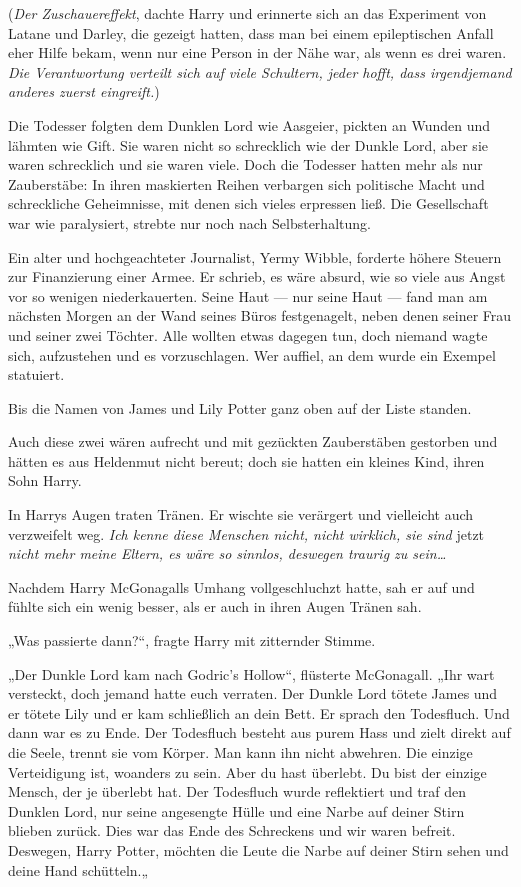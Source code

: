 {(\emph{Der Zuschauereffekt}, dachte Harry und erinnerte sich an das Experiment von Latane und Darley, die gezeigt hatten, dass man bei einem epileptischen Anfall eher Hilfe bekam, wenn nur eine Person in der Nähe war, als wenn es drei waren. \emph{Die Verantwortung verteilt sich auf viele Schultern, jeder hofft, dass irgendjemand anderes zuerst eingreift.})

Die Todesser folgten dem Dunklen Lord wie Aasgeier, pickten an Wunden und lähmten wie Gift. Sie waren nicht so schrecklich wie der Dunkle Lord, aber sie waren schrecklich und sie waren viele. Doch die Todesser hatten mehr als nur Zauberstäbe: In ihren maskierten Reihen verbargen sich politische Macht und schreckliche Geheimnisse, mit denen sich vieles erpressen ließ. Die Gesellschaft war wie paralysiert, strebte nur noch nach Selbsterhaltung.

Ein alter und hochgeachteter Journalist, Yermy Wibble, forderte höhere Steuern zur Finanzierung einer Armee. Er schrieb, es wäre absurd, wie so viele aus Angst vor so wenigen niederkauerten. Seine Haut --- nur seine Haut --- fand man am nächsten Morgen an der Wand seines Büros festgenagelt, neben denen seiner Frau und seiner zwei Töchter. Alle wollten etwas dagegen tun, doch niemand wagte sich, aufzustehen und es vorzuschlagen. Wer auffiel, an dem wurde ein Exempel statuiert.

Bis die Namen von James und Lily Potter ganz oben auf der Liste standen.

Auch diese zwei wären aufrecht und mit gezückten Zauberstäben gestorben und hätten es aus Heldenmut nicht bereut; doch sie hatten ein kleines Kind, ihren Sohn Harry.

In Harrys Augen traten Tränen. Er wischte sie verärgert und vielleicht auch verzweifelt weg. \emph{Ich kenne diese Menschen nicht, nicht wirklich, sie sind} jetzt \emph{nicht mehr meine Eltern, es wäre so sinnlos, deswegen traurig zu sein…}

Nachdem Harry McGonagalls Umhang vollgeschluchzt hatte, sah er auf und fühlte sich ein wenig besser, als er auch in ihren Augen Tränen sah.

„Was passierte dann?“, fragte Harry mit zitternder Stimme.

„Der Dunkle Lord kam nach Godric's Hollow“, flüsterte McGonagall. „Ihr wart versteckt, doch jemand hatte euch verraten. Der Dunkle Lord tötete James und er tötete Lily und er kam schließlich an dein Bett. Er sprach den Todesfluch. Und dann war es zu Ende. Der Todesfluch besteht aus purem Hass und zielt direkt auf die Seele, trennt sie vom Körper. Man kann ihn nicht abwehren. Die einzige Verteidigung ist, woanders zu sein. Aber du hast überlebt. Du bist der einzige Mensch, der je überlebt hat. Der Todesfluch wurde reflektiert und traf den Dunklen Lord, nur seine angesengte Hülle und eine Narbe auf deiner Stirn blieben zurück. Dies war das Ende des Schreckens und wir waren befreit. Deswegen, Harry Potter, möchten die Leute die Narbe auf deiner Stirn sehen und deine Hand schütteln.„

}
